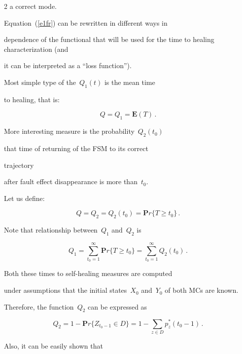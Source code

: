 \begin{multicols}{2}
a correct mode.



Equation~(\ref{e1fr}) can be rewritten in different ways in

dependence of the functional that will be used for the time to healing characterization (and

it can be interpreted as a ``loss function'').



Most simple type of the~$Q_1(t)$ is the mean time

to healing, that is:

$$

Q = Q_1 = {\mathbf E}(T)\,.

$$



More interesting measure is the probability~$Q_2(t_0)$

that time of returning of the FSM to its correct

trajectory

after fault effect disappearance  is more than~$t_0$.

Let us define:

$$

Q = Q_2 = Q_2(t_0) = {\mathbf Pr}\{T\ge t_0\}\,.

$$

Note that relationship between~$Q_1$ and~$Q_2$ is

$$

Q_1 =

\sum_{t_0=1}^\infty {\mathbf Pr}\{T\ge t_0\}

=

\sum_{t_0=1}^\infty Q_2(t_0)\,.

$$



Both these times to self-healing measures are computed

under assumptions that the initial states~$X_0$ and~$Y_0$ of both MCs are known.

Therefore, the function~$Q_2$ can be expressed as

$$

Q_2

=

1 - {\mathbf Pr}\{Z_{t_0-1}\in D\}

=

1 - \sum_{z\in D} p_{z}^*(t_0-1)\,.

$$

Also, it can be easily shown   that


\end{multicols}

